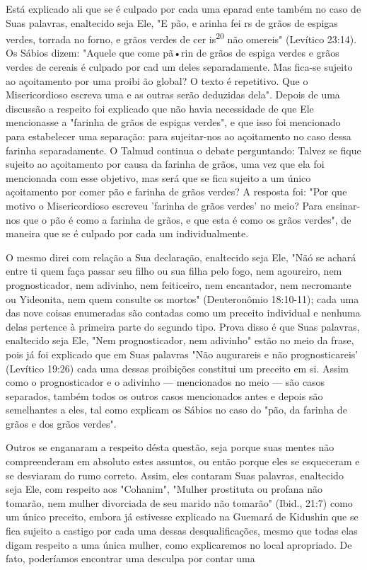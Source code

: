\begin{itemize}
\begin{enumrate}
Está explicado ali que se é culpado por cada uma eparad ente tam­bém no
caso de Suas palavras, enaltecido seja Ele, "E pão, e arinha fei rs de
grãos de espigas verdes, torrada no forno, e grãos verdes de cer
is\textsuperscript{20} não omereis" (Levítico 23:14). Os Sábios dizem:
"Aquele que come pã•rin de grãos de espiga verdes e grãos verdes de
cereais é culpado por cad um deles separada­mente. Mas fica-se sujeito
ao açoitamento por uma proibi ão global? O texto é repetitivo. Que o
Misericordioso escreva uma e as outras serão deduzidas de­la". Depois de
uma discussão a respeito foi explicado que não havia necessida­de de que
Ele mencionasse a "farinha de grãos de espigas verdes", e que isso foi
mencionado para estabelecer uma separação: para sujeitar-nos ao
açoitamento no caso dessa farinha separadamente. O Talmud continua o
debate perguntan­do: Talvez se fique sujeito ao açoitamento por causa da
farinha de grãos, uma vez que ela foi mencionada com esse objetivo, mas
será que se fica sujeito a um único açoitamento por comer pão e farinha
de grãos verdes? A resposta foi: "Por que motivo o Misericordioso
escreveu 'farinha de grãos verdes' no meio? Para ensinar-nos que o pão é
como a farinha de grãos, e que esta é como os grãos verdes", de maneira
que se é culpado por cada um individualmente.

O mesmo direi com relação a Sua declaração, enaltecido seja Ele, "Nãó se
achará entre ti quem faça passar seu filho ou sua filha pelo fogo, nem
agoureiro, nem prognosticador, nem adivinho, nem feiticeiro, nem
encanta­dor, nem necromante ou Yideonita, nem quem consulte os mortos"
(Deutero­nômio 18:10-11); cada uma das nove coisas enumeradas são
contadas como um preceito individual e nenhuma delas pertence à primeira
parte do segundo ti­po. Prova disso é que Suas palavras, enaltecido seja
Ele, "Nem prognosticador, nem adivinho" estão no meio da frase, pois já
foi explicado que em Suas pala­vras "Não augurareis e não
prognosticareis' (Levítico 19:26) cada uma dessas proibições constitui
um preceito em si. Assim como o prognosticador e o adi­vinho ---
mencionados no meio --- são casos separados, também todos os ou­tros
casos mencionados antes e depois são semelhantes a eles, tal como
expli­cam os Sábios no caso do "pão, da farinha de grãos e dos grãos
verdes".

Outros se enganaram a respeito désta questão, seja porque suas men­tes
não compreenderam em absoluto estes assuntos, ou então porque eles se
esqueceram e se desviaram do rumo correto. Assim, eles contaram Suas
pala­vras, enaltecido seja Ele, com respeito aos "Cohanim", "Mulher
prostituta ou profana não tomarão, nem mulher divorciada de seu marido
não tomarão" (Ibid., 21:7) como um único preceito, embora já estivesse
explicado na Guemará de Kidushin que se fica sujeito a castigo por cada
uma dessas desqualificações, mes­mo que todas elas digam respeito a uma
única mulher, como explicaremos no local apropriado. De fato, poderíamos
encontrar uma desculpa por contar uma


\end{enumrate}
\end{itemize}
